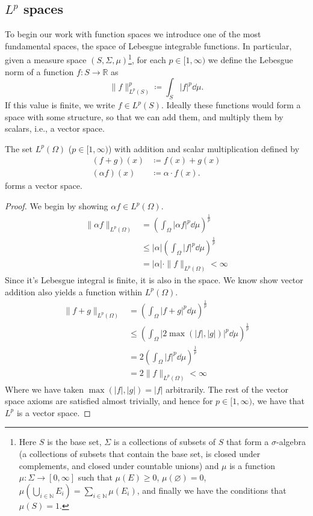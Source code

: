 \subsection{\texorpdfstring{$L^p$}{Lp} spaces}\label{subsec:lp}
To begin our work with function spaces we introduce one of the most fundamental spaces, the space of Lebesgue integrable functions. In particular, given a measure space $(S,\Sigma, \mu)$\footnote{Here $S$ is the base set, $\Sigma$ is a collections of subsets of $S$ that form a $\sigma$-algebra (a collections of subsets that contain the base set, is closed under complements, and closed under countable unions) and $\mu$ is a function $\mu:\Sigma\to[0,\infty]$ such that $\mu(E)\geq 0$, $\mu(\varnothing) = 0$, $\mu\left(\bigcup_{i\in\mathbb{N}}E_i\right) = \sum_{i\in\mathbb{N}}\mu(E_i)$, and finally we have the conditions that $\mu(S) = 1$.}, for each $p\in[1,\infty)$ we define the Lebesgue norm of a function $f:S\to\mathbb{R}$ as
\begin{equation}
\|f\|_{L^p(S)}^p\coloneqq \int_S|f|^p\dd{\mu}.
\end{equation}
If this value is finite, we write $f\in L^p(S)$. Ideally these functions would form a space with some structure, so that we can add them, and multiply them by scalars, i.e., a vector space.
\begin{lemma}
The set $L^p(\Omega)$ ($p\in[1,\infty)$) with addition and scalar multiplication defined by
\begin{align}
(f + g)(x) & \coloneqq f(x) + g(x) \\
(\alpha f)(x) & \coloneqq \alpha\cdot f(x).
\end{align}
forms a vector space.
\end{lemma}
\begin{proof}
We begin by showing $\alpha f\in L^p(\Omega)$.
\begin{align*}
\|\alpha f\|_{L^p(\Omega)} & = \left(\int_\Omega |\alpha f|^p\dd{\mu}\right)^\frac{1}{p} \\
 & \leq |\alpha|\left(\int_\Omega |f|^p\dd{\mu}\right)^\frac{1}{p}\\
 & = |\alpha|\cdot\|f\|_{L^p(\Omega)} < \infty
\end{align*}
Since it's Lebesgue integral is finite, it is also in the space. We know show vector addition also yields a function within $L^p(\Omega)$.
\begin{align*}
\|f + g\|_{L^p(\Omega)} & = \left(\int_\Omega |f + g|^p\dd{\mu}\right)^\frac{1}{p} \\
 & \leq \left(\int_\Omega |2\max{(|f|,|g|)}|^p\dd{\mu}\right)^\frac{1}{p} \\
 & = 2\left(\int_\Omega |f|^p\dd{\mu}\right)^\frac{1}{p} \\
 & = 2\|f\|_{L^p(\Omega)} < \infty
\end{align*}
Where we have taken $\max{(|f|,|g|)} = |f|$ arbitrarily. The rest of the vector space axioms are satisfied almost trivially, and hence for $p\in[1,\infty)$, we have that $L^p$ is a vector space.
\end{proof}

